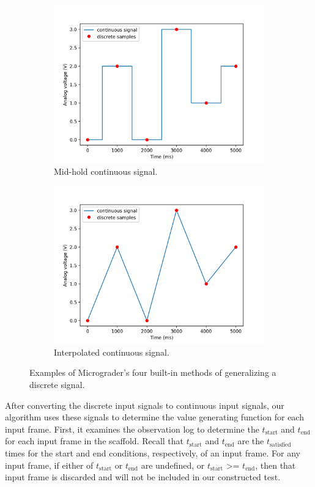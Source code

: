 \documentclass[12pt]{article}
\begin{document}
\begin{figure}
\begin{subfigure}[b]{.45\linewidth}
\includegraphics[width=\linewidth]{input-mid.png}
\caption{Mid-hold continuous signal.}
\end{subfigure}
\begin{subfigure}[b]{.45\linewidth}
\includegraphics[width=\linewidth]{input-inter.png}
\caption{Interpolated continuous signal.}
\end{subfigure}
\caption{Examples of Micrograder's four built-in methods of generalizing a discrete signal.}
\label{fig:interpolation}
\end{figure}

After converting the discrete input signals to continuous input signals, our algorithm uses these signals to determine the value generating function for each input frame.  First, it examines the observation log to determine the $t_{\text{start}}$ and $t_{\text{end}}$ for each input frame in the scaffold.  Recall that $t_{\text{start}}$ and $t_{\text{end}}$ are the $t_{\text{satisfied}}$ times for the start and end conditions, respectively, of an input frame.  For any input frame, if either of $t_{\text{start}}$ or $t_{\text{end}}$ are undefined, or $t_{\text{start}}$ >= $t_{\text{end}}$, then that input  frame is discarded and will not be included in our constructed test.
\end{document}
